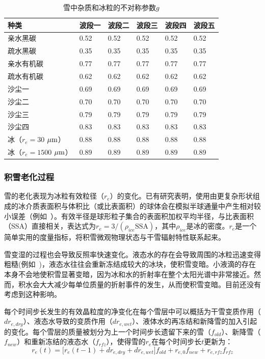 \begin{table}[htbp]
\centering
\caption{雪中杂质和冰粒的不对称参数$g$}
\label{tab:积雪不对称参数}
\begin{tabular}{llllll}
\toprule
种类 & 波段一 & 波段二 & 波段三 & 波段四 & 波段五 \\ \midrule
亲水黑碳 & 0.52 & 0.52 & 0.52 & 0.52 & 0.52 \\
疏水黑碳 & 0.35 & 0.35 & 0.35 & 0.35 & 0.35 \\
亲水有机碳 & 0.77 & 0.77 & 0.77 & 0.77 & 0.77 \\
疏水有机碳 & 0.62 & 0.62 & 0.62 & 0.62 & 0.62 \\
沙尘一 & 0.69 & 0.69 & 0.69 & 0.69 & 0.69 \\
沙尘二 & 0.70 & 0.70 & 0.70 & 0.70 & 0.70 \\
沙尘三 & 0.79 & 0.79 & 0.79 & 0.79 & 0.79 \\
沙尘四 & 0.83 & 0.83 & 0.83 & 0.83 & 0.83 \\
冰（$r_{e}=30$ $\mu\rm{m}$） & 0.88 & 0.88 & 0.88 & 0.88 & 0.88 \\
冰（$r_{e}=1500$ $\mu\rm{m}$） & 0.89 & 0.89 & 0.89 & 0.89 & 0.89\\ \bottomrule
\end{tabular}
\end{table}

\subsubsection{积雪老化过程}\label{积雪老化}

雪的老化表现为冰粒有效粒径（$r_e$）的变化。已有研究表明，使用由更复杂形状组成的冰介质表面积与体积比（或比表面积）的球体会在模拟半球通量中产生相对较小误差（例如~\citet{grenfell1999RepresentationNonsphericalIce}）。有效半径是球形粒子集合的表面积加权平均半径，与比表面积（SSA）直接相关，表达式为$r_e=3/(\rho_{ice}\text{SSA})$，其中$\rho_{ice}$是冰的密度。$r_e$是一个简单实用的度量指标，将积雪微观物理状态与干雪辐射特性联系起来。

雪变湿的过程也会导致反照率快速变化。液态水的存在会导致周围的冰粒迅速变得粗糙(例如~\citet{brun1989InvestigationWetSnowMetamorphism})，液态水往往会重新冻结成较大的冰块，使积雪变暗。小液滴的存在本身不会地使积雪显著变暗，因为冰和水的折射率在整个太阳光谱中非常接近。然而，积水会大大减少每单位质量的折射事件的发生，从而使积雪变暗。目前还没有考虑到这种影响。

每个时间步长发生的有效晶粒度的净变化在每个雪层中可以概括为干雪变质作用（$dr_{e,dry}$）、液态水导致的变质作用（$dr_{e,wet}$）、液体水的再冻结和新降雪的加入引起的变化。每个雪层的质量被划分为上一个时间步长遗留下来的雪（$f_{old}$）、新降雪（$f_{new}$）和重新冻结的液态水（$f_{rfz}$），使得雪的$r_e$在每个时间步长${t}$更新为：
\begin{equation}
r_{e}(t) = \lbrack r_{e}(t - 1) + {dr}_{e,dry} + {dr}_{e,wet}\rbrack f_{old} + r_{e,0}f_{new} + r_{e,rfz}f_{rfz}
\end{equation}

